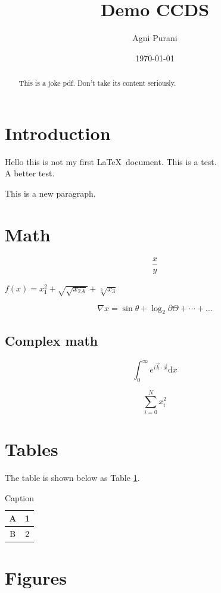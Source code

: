 \documentclass{article}
\title{Demo CCDS}
\author{Agni Purani}
\date{\today}
\begin{document}
\maketitle


\begin{abstract}
    This is a joke pdf. Don't take its content seriously.
\end{abstract}

\section{Introduction}

Hello this is not my first \LaTeX\ document.
This is a test.\\[12pt]
A better test.

This is a new paragraph.

\section{Math}
$$\frac{x}{y}$$

$f(x) = x_1^2 + \sqrt{\sqrt{x_{2A}}} + \sqrt[5]{x_3}$

\begin{equation}
    \nabla x = \sin\theta+\log_2\partial\Theta + \cdots + \ldots
\end{equation}

\subsection{Complex math}
$$\int_0^\infty e^{i \vec{k} \cdot \vec{x}}\mathrm{d}x$$

$$\sum_{i=0}^N x_i^2$$

\section{Tables}

The table is shown below as Table \ref{tab:my_label}.

\begin{table}[h]
    \centering
    \begin{tabular}{|c|c|}
        \hline
         A & 1  \\\hline
         B & 2  \\\hline
    \end{tabular}
    \caption{Caption}
    \label{tab:my_label}
\end{table}

\section{Figures}
\end{document}

